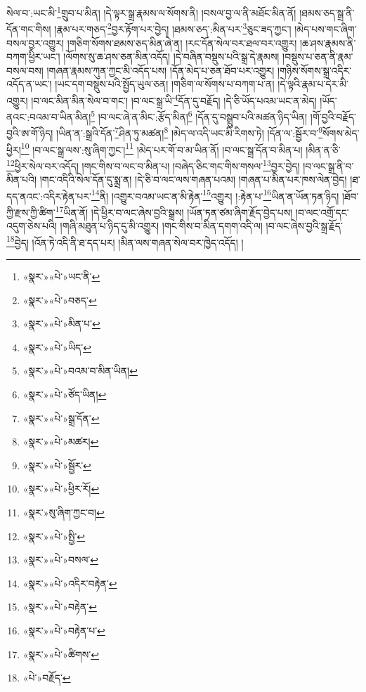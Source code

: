 སེལ་བ་:ཡང་མི་\footnote{«སྣར་»«པེ་»ཡང་ནི་}གྲུབ་པ་མིན། །དེ་ལྟར་སྒྲ་རྣམས་ལ་སོགས་ནི། །བསལ་བྱ་ལ་ནི་མཐོང་མིན་ནོ། །ཐམས་ཅད་སྒྲ་ནི་དོན་གང་གིས། །རྣམ་པར་གཅད་\footnote{«སྣར་»«པེ་»བཅད་}བྱར་རྟོག་པར་བྱེད། །ཐམས་ཅད་:མིན་པར་\footnote{«སྣར་»«པེ་»མིན་པ་}ཅུང་ཟད་ཀྱང་། །མེད་པས་གང་ཞིག་བསལ་བྱར་འགྱུར། །གཅིག་སོགས་ཐམས་ཅད་མིན་ཞེ་ན། །རང་དོན་སེལ་བར་ཐལ་བར་འགྱུར། །ཆ་ཤས་རྣམས་ནི་བཀག་ཕྱིར་ཡང་། །ལོགས་སུ་ཆ་ཤས་ཅན་མིན་འདོད། །དེ་བཞིན་བསྡུས་པའི་སྒྲ་དེ་རྣམས། །བསྡུས་པ་ཅན་ནི་རྣམ་བསལ་བས། །གཞན་རྣམས་ཀུན་ཀྱང་མི་འདོད་པས། །དོན་མེད་པ་ཅན་ཐོབ་པར་འགྱུར། །གཉིས་སོགས་སྒྲ་འདིར་འདོད་ན་ཡང་། །ཡང་དག་བསྡུས་པའི་སྤྱོད་ཡུལ་ཅན། །གཅིག་ལ་སོགས་པ་བཀག་པ་ན། །དེ་ལྟའི་རྣམ་པ་དེར་མི་འགྱུར། །བ་ལང་མིན་མིན་སེལ་བ་གང་། །བ་ལང་སྒྲ་ཡི་\footnote{«སྣར་»«པེ་»ཡིད་}དོན་དུ་བརྗོད། །དེ་ཅི་ཡོད་པའམ་ཡང་ན་མེད། །ཡོད་ནའང་:བའམ་བ་ཡིན་མིན།\footnote{«སྣར་»«པེ་»བའམ་བ་མིན་ཡིན།} །བ་ལང་ཞེ་ན་མིང་:རྩོད་མིན།\footnote{«སྣར་»«པེ་»ཙོད་ཡིན།} །དོན་དུ་བསྒྲུབ་པའི་མཚན་ཉིད་ཡིན། །གོ་བྱའི་བརྗོད་བྱའི་ཨ་གོ་ཉིད། །ཡིན་ན་:སྒྲའི་དོན་\footnote{«སྣར་»«པེ་»སྒྲ་དོན་}ཤིན་ཏུ་མཚན།\footnote{«སྣར་»«པེ་»མཚར།} །མེད་ལ་འདི་ཡང་མི་རིགས་ཏེ། །དོན་ལ་:སྦྱོར་བ་\footnote{«སྣར་»«པེ་»སྦྱོར་}སོགས་མེད་ཕྱིར།\footnote{«སྣར་»«པེ་»ཕྱིར་རོ།} །བ་ལང་སྒྲ་ལས་:སུ་ཞིག་ཀྱང་།\footnote{«སྣར་»སུ་ཞིག་ཀྱང་བ།} །མེད་པར་གོ་བ་མ་ཡིན་ནོ། །བ་ལང་སྒྲ་དོན་བ་མིན་པ། །མིན་ན་ཅི་\footnote{«སྣར་»«པེ་»སྤྱི་}ཕྱིར་སེལ་བར་འདོད། །གང་གིས་བ་ལང་བ་མིན་པ། །བཞེད་ཅིང་གང་གིས་གསལ་\footnote{«སྣར་»«པེ་»བསལ་}བྱར་བྱེད། །བ་ལང་སྒྲ་ནི་བ་མིན་པའི། །གང་འདིའི་སེལ་དོན་དུ་སྨྲ་ན། །དེ་ཅི་བ་ལང་ལས་གཞན་པའམ། །གཞན་པ་མིན་པར་ཁས་ལེན་བྱེད། །ཐ་དད་ནའང་:འདིར་རྟེན་པར་\footnote{«སྣར་»«པེ་»འདིར་བརྟེན་}ནི། །འགྱུར་བའམ་ཡང་ན་མི་རྟེན་\footnote{«སྣར་»«པེ་»བརྟེན་}འགྱུར། །:རྟེན་པ་\footnote{«སྣར་»«པེ་»བརྟེན་པ་}ཡིན་ན་ཡོན་ཏན་ཉིད། །ཐོབ་ཀྱི་རྫས་ཀྱི་ཚིག་\footnote{«སྣར་»«པེ་»ཚིགས་}ཡིན་ནོ། །དེ་ཕྱིར་བ་ལང་ཞེས་བྱའི་སྒྲས། །ཡོན་ཏན་ཙམ་ཞིག་རྗོད་བྱེད་པས། །བ་ལང་འགྲོ་དང་འདུག་ཅེས་པའི། །གཞི་མཐུན་པ་ཉིད་དུ་མི་འགྱུར། །གང་གིས་བ་མིན་དགག་འདི་ལ། །བ་ལང་ཞེས་བྱའི་སྒྲ་རྗོད་\footnote{«པེ་»བརྗོད་}བྱེད། །འོན་ཏེ་འདི་ནི་ཐ་དད་པར། །མིན་ལས་གཞན་སེལ་བར་ཁྱེད་འདོད། །
